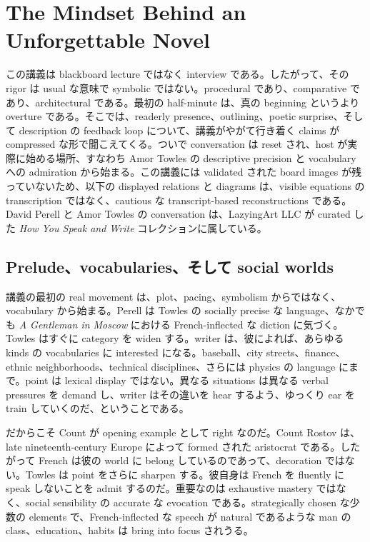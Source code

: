\chapter{The Mindset Behind an Unforgettable Novel}

この講義は blackboard lecture ではなく interview である。したがって、その rigor は usual な意味で symbolic ではない。procedural であり、comparative であり、architectural である。最初の half-minute は、真の beginning というより overture である。そこでは、readerly presence、outlining、poetic surprise、そして description の feedback loop について、講義がやがて行き着く claims が compressed な形で聞こえてくる。ついで conversation は reset され、host が実際に始める場所、すなわち Amor Towles の descriptive precision と vocabulary への admiration から始まる。この講義には validated された board images が残っていないため、以下の displayed relations と diagrams は、visible equations の transcription ではなく、cautious な transcript-based reconstructions である。David Perell と Amor Towles の conversation は、LazyingArt LLC が curated した \emph{How You Speak and Write} コレクションに属している。

\section{Prelude、vocabularies、そして social worlds}

講義の最初の real movement は、plot、pacing、symbolism からではなく、vocabulary から始まる。Perell は Towles の socially precise な language、なかでも \emph{A Gentleman in Moscow} における French-inflected な diction に気づく。Towles はすぐに category を widen する。writer は、彼によれば、あらゆる kinds の vocabularies に interested になる。baseball、city streets、finance、ethnic neighborhoods、technical disciplines、さらには physics の language にまで。point は lexical display ではない。異なる situations は異なる verbal pressures を demand し、writer はその違いを hear するよう、ゆっくり ear を train していくのだ、ということである。

だからこそ Count が opening example として right なのだ。Count Rostov は、late nineteenth-century Europe によって formed された aristocrat である。したがって French は彼の world に belong しているのであって、decoration ではない。Towles は point をさらに sharpen する。彼自身は French を fluently に speak しないことを admit するのだ。重要なのは exhaustive mastery ではなく、social sensibility の accurate な evocation である。strategically chosen な少数の elements で、French-inflected な speech が natural であるような man の class、education、habits は bring into focus されうる。

